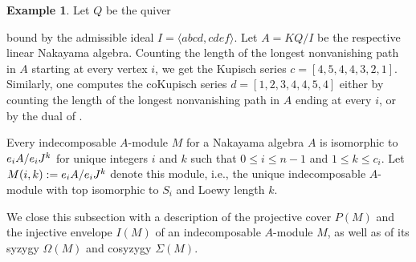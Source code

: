 \documentclass[a4paper]{amsart}
\theoremstyle{definition}
\newtheorem{example}[theorem]{Example}
\theoremstyle{remark}
\numberwithin{equation}{theorem}
\newcommand{\K}{K}
\begin{document}
\begin{example}\label{example:linearnakayama}
    Let $Q$ be the quiver
    \begin{figure}[H]
    \begin{center}
    \end{center}
    \end{figure}
    \noindent{}bound by the admissible ideal $I = \langle abcd, cdef\rangle$. Let $A = \K Q/I$ be the respective linear Nakayama algebra.
    Counting the length of the longest nonvanishing path in $ A $ starting at every vertex $i$, we get the Kupisch series $c = [4,5,4,4,3,2,1]$. Similarly, one computes the coKupisch series $d = [1,2,3,4,4,5,4]$ either by counting the length of the longest nonvanishing path in $A$ ending at every $i$, or by the dual of .
    \end{example}

Every indecomposable $A$-module $M$ for a Nakayama algebra $A$ is isomorphic to $ \indec $ for unique integers $ i $ and $ k $ such that $0 \leq i \leq n - 1$ and $1 \leq k \leq c_i$. Let $\mik := \indec$ denote this module, i.e., the unique indecomposable $A$-module with top isomorphic to $S_i$ and Loewy length $k$.

We close this subsection with a description of the projective cover $P(M)$ and the injective envelope $I(M)$ of an indecomposable $ A $-module $ M $, as well as of its syzygy $\Omega(M)$ and cosyzygy $\Sigma (M)$.
\end{document}
